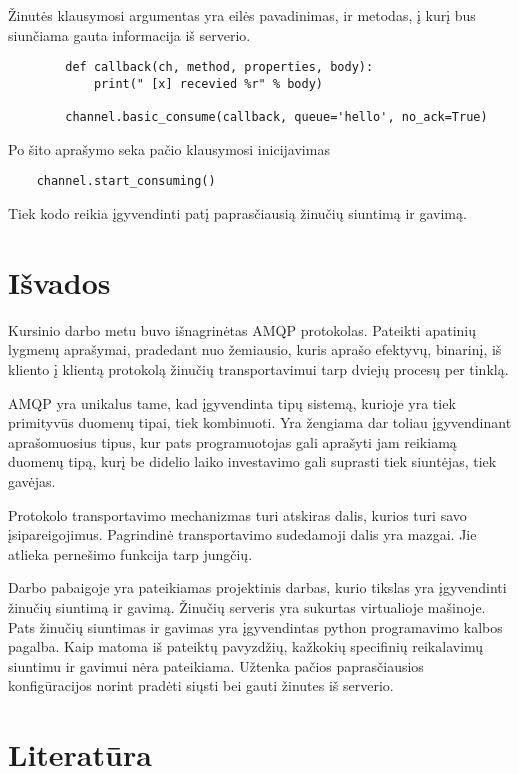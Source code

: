 \documentclass[12pt, a4paper, lithuanian]{article}
\begin{document}
    Žinutės klausymosi argumentas yra eilės pavadinimas, ir metodas, į kurį bus siunčiama gauta informacija iš serverio.

    \begin{lstlisting}
        def callback(ch, method, properties, body):
            print(" [x] recevied %r" % body)

        channel.basic_consume(callback, queue='hello', no_ack=True)
    \end{lstlisting}

    Po šito aprašymo seka pačio klausymosi inicijavimas

    \begin{lstlisting}
    channel.start_consuming()
    \end{lstlisting}

    Tiek kodo reikia įgyvendinti patį paprasčiausią žinučių siuntimą ir gavimą.

    \begin{figure}

        \label{img:producer_consumer_example}
    \end{figure}

    \section{Išvados}

    Kursinio darbo metu buvo išnagrinėtas AMQP protokolas. 
    Pateikti apatinių lygmenų aprašymai, pradedant nuo žemiausio, kuris aprašo efektyvų, binarinį, iš kliento į klientą protokolą žinučių transportavimui tarp dviejų procesų per tinklą.

    AMQP yra unikalus tame, kad įgyvendinta tipų sistemą, kurioje yra tiek primityvūs duomenų tipai, tiek kombinuoti.
    Yra žengiama dar toliau įgyvendinant aprašomuosius tipus, kur pats programuotojas gali aprašyti jam reikiamą duomenų tipą, kurį be didelio laiko investavimo gali suprasti tiek siuntėjas, tiek gavėjas.

    Protokolo transportavimo mechanizmas turi atskiras dalis, kurios turi savo įsipareigojimus. Pagrindinė transportavimo sudedamoji dalis yra mazgai.
    Jie atlieka pernešimo funkcija tarp jungčių.

    Darbo pabaigoje yra pateikiamas projektinis darbas, kurio tikslas yra įgyvendinti žinučių siuntimą ir gavimą. Žinučių serveris yra sukurtas virtualioje mašinoje.
    Pats žinučių siuntimas ir gavimas yra įgyvendintas python programavimo kalbos pagalba.
    Kaip matoma iš pateiktų pavyzdžių, kažkokių specifinių reikalavimų siuntimu ir gavimui nėra pateikiama.
    Užtenka pačios paprasčiausios konfigūracijos norint pradėti siųsti bei gauti žinutes iš serverio.

    \newpage
    \section{Literatūra}

    
    
\end{document}
